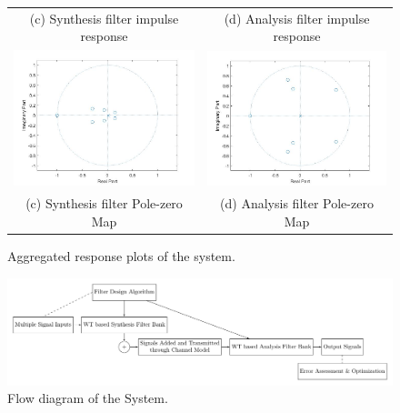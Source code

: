 \begin{figure}[htpb]
\begin{tabular}{cc}
(c) Synthesis filter impulse response & (d) Analysis filter impulse response\\[10pt]
\includegraphics[width=80mm]{H_System_pzmap.jpg} & \includegraphics[width=80mm]{G_System_pzmap.jpg} \\ [10pt]
(c) Synthesis filter Pole-zero Map & (d) Analysis filter Pole-zero Map\\[10pt]
\end{tabular}
\caption{Aggregated response plots of the system.}
\label{system}
\end{figure}

\newpage


\begin{figure}[htpb]
\centering
\includegraphics[width=5.95in]{process_flow.pdf}
\caption{Flow diagram of the System.}
\label{flow}
\end{figure}

